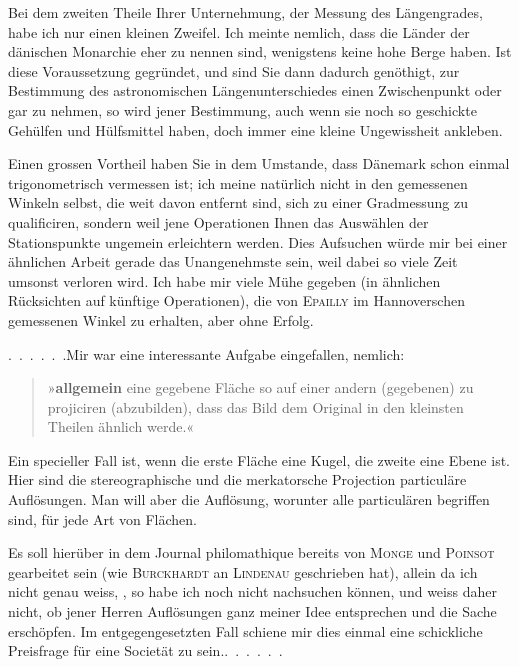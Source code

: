 \par\noindent\hspace*{\parindent}Bei dem zweiten Theile Ihrer Unternehmung, der Messung des Längengrades, habe ich nur einen kleinen Zweifel. Ich meinte nemlich, dass die Länder der dänischen Monarchie eher  zu nennen sind, wenigstens keine hohe Berge haben. Ist diese Voraussetzung gegründet, und sind Sie dann dadurch genöthigt, zur Bestimmung des astronomischen Längenunterschiedes einen Zwischenpunkt oder gar  zu nehmen, so wird jener Bestimmung, auch wenn sie noch so geschickte Gehülfen und Hülfsmittel haben, doch immer eine kleine Ungewissheit ankleben.

\par\noindent\hspace*{\parindent}Einen grossen Vortheil haben Sie in dem Umstande, dass Dänemark schon einmal trigonometrisch vermessen ist; ich meine natürlich nicht in den gemessenen Winkeln selbst, die weit davon entfernt sind, sich zu einer Gradmessung zu qualificiren, sondern weil jene Operationen Ihnen das Auswählen der Stationspunkte ungemein erleichtern werden. Dies Aufsuchen würde mir bei einer ähnlichen Arbeit gerade das Unangenehmste sein, weil dabei so viele Zeit umsonst verloren wird. Ich habe mir viele Mühe gegeben (in ähnlichen Rücksichten auf künftige Operationen), die von \textsc{Epailly} im Hannoverschen gemessenen Winkel zu erhalten, aber ohne Erfolg.

\par\noindent\hspace*{\parindent}.\ .\ .\ .\ .\ .\quad Mir war eine interessante Aufgabe eingefallen, nemlich:
\begin{quote}
\noindent»\textbf{allgemein} eine gegebene Fläche so auf einer andern (gegebenen) zu projiciren (abzubilden), dass das Bild dem Original in den kleinsten Theilen ähnlich werde.«
\end{quote}
\par\noindent\hspace*{\parindent}Ein specieller Fall ist, wenn die erste Fläche eine Kugel, die zweite eine Ebene ist. Hier sind die stereographische und die merkatorsche Projection particuläre Auflösungen. Man will aber die  Auflösung, worunter alle particulären begriffen sind, für jede Art von Flächen.

\par\noindent\hspace*{\parindent}Es soll hierüber in dem Journal philomathique bereits von \textsc{Monge} und \textsc{Poinsot} gearbeitet sein (wie \textsc{Burckhardt} an \textsc{Lindenau} geschrieben hat), allein da ich nicht genau weiss, , so habe ich noch nicht nachsuchen können, und weiss daher nicht, ob jener Herren Auflösungen ganz meiner Idee entsprechen und die Sache erschöpfen. Im entgegengesetzten Fall schiene mir dies einmal eine schickliche Preisfrage für eine Societät zu sein.\quad.\ .\ .\ .\ .\ .
